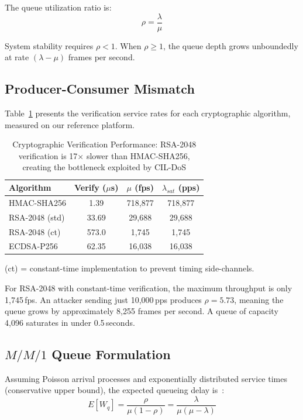 \documentclass{ieeeaccess}
\begin{document}
The queue utilization ratio is:
\begin{equation}
\rho = \frac{\lambda}{\mu}
\end{equation}

System stability requires $\rho < 1$. When $\rho \geq 1$, the queue depth grows unboundedly at rate $(\lambda - \mu)$ frames per second.

\subsection{Producer-Consumer Mismatch}
Table~\ref{tab:service_rates} presents the verification service rates for each cryptographic algorithm, measured on our reference platform.

\begin{table}[t]
\caption{Cryptographic Verification Performance: RSA-2048 verification is 17$\times$ slower than HMAC-SHA256, creating the bottleneck exploited by CIL-DoS}
\label{tab:service_rates}
\centering
\small
\begin{tabular}{lccc}
\toprule
\textbf{Algorithm} & \textbf{Verify} ($\mu$s) & $\mu$ \textbf{(fps)} & $\lambda_{sat}$ \textbf{(pps)} \\
\midrule
HMAC-SHA256 & 1.39    & 718,877 & 718,877 \\
RSA-2048 (std) & 33.69   & 29,688  & 29,688 \\
RSA-2048 (ct) & 573.0   & 1,745   & 1,745 \\
ECDSA-P256  & 62.35   & 16,038  & 16,038 \\
\bottomrule
\end{tabular}
\vspace{1mm}
\small{(ct) = constant-time implementation to prevent timing side-channels.}
\end{table}

For RSA-2048 with constant-time verification, the maximum throughput is only 1,745\,fps. An attacker sending just 10,000\,pps produces $\rho = 5.73$, meaning the queue grows by approximately 8,255 frames per second. A queue of capacity 4,096 saturates in under 0.5\,seconds.

\subsection{$M/M/1$ Queue Formulation}
Assuming Poisson arrival processes and exponentially distributed service times (conservative upper bound), the expected queueing delay is~\cite{kleinrock1975queueing}:
\begin{equation}
E[W_q] = \frac{\rho}{\mu(1-\rho)} = \frac{\lambda}{\mu(\mu - \lambda)}
\end{equation}
\end{document}
